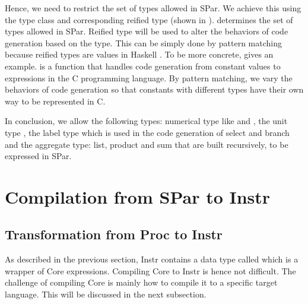 Hence, we need to restrict the set of types allowed in SPar. We achieve this using the type class  and corresponding reified type  (shown in ).  determines the set of types allowed in SPar. Reified type  will be used to alter the behaviors of code generation based on the type. This can be simply done by pattern matching because reified types are values in Haskell \cite{ReifiedTypeHaskellWiki}. To be more concrete,  gives an example.  is a function that handles code generation from constant values to expressions in the C programming language. By pattern matching, we vary the behaviors of code generation so that constants with different types have their own way to be represented in C.

In conclusion, we allow the following types: numerical type like  and , the unit type \hask{()}, the label type which is used in the code generation of select and branch and the aggregate type: list, product and sum that are built recursively, to be expressed in SPar.

\section{Compilation from SPar to Instr}
\subsection{Transformation from Proc to Instr}
As described in the previous section, Instr contains a data type called  which is a wrapper of Core expressions. Compiling Core to Instr is hence not difficult. The challenge of compiling Core is mainly how to compile it to a specific target language. This will be discussed in the next subsection.  

